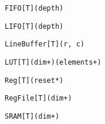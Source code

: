\begin{table*}
\newsavebox{\fifoSyntax}
\begin{lrbox}{\fifoSyntax}
\begin{lstlisting}[language=SpatialTable]
FIFO[T](depth)
\end{lstlisting}
\end{lrbox}

\newsavebox{\filoSyntax}
\begin{lrbox}{\filoSyntax}
\begin{lstlisting}[language=SpatialTable]
LIFO[T](depth)
\end{lstlisting}
\end{lrbox}

\newsavebox{\lineBufferSyntax}
\begin{lrbox}{\lineBufferSyntax}
\begin{lstlisting}[language=SpatialTable]
LineBuffer[T](r, c)
\end{lstlisting}
\end{lrbox}

\newsavebox{\lutSyntax}
\begin{lrbox}{\lutSyntax}
\begin{lstlisting}[language=SpatialTable]
LUT[T](dim+)(elements+)
\end{lstlisting}
\end{lrbox}

\newsavebox{\regSyntax}
\begin{lrbox}{\regSyntax}
\begin{lstlisting}[language=SpatialTable]
Reg[T](reset*)
\end{lstlisting}
\end{lrbox}

\newsavebox{\regfileSyntax}
\begin{lrbox}{\regfileSyntax}
\begin{lstlisting}[language=SpatialTable]
RegFile[T](dim+)
\end{lstlisting}
\end{lrbox}

\newsavebox{\sramSyntax}
\begin{lrbox}{\sramSyntax}
\begin{lstlisting}[language=SpatialTable]
SRAM[T](dim+)
\end{lstlisting}
\end{lrbox}


\end{table*}
